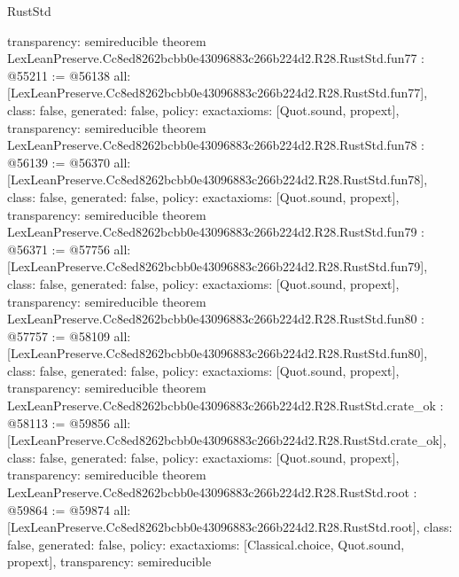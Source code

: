 \begin{lexlean}{RustStd}
\begin{coremodule}
{  transparency: semireducible
}
theorem LexLeanPreserve.Cc8ed8262bcbb0e43096883c266b224d2.R28.RustStd.fun77 : @55211 := @56138 {
  all: [LexLeanPreserve.Cc8ed8262bcbb0e43096883c266b224d2.R28.RustStd.fun77],
  class: false,
  generated: false,
  policy: exact{axioms: [Quot.sound, propext]},
  transparency: semireducible
}
theorem LexLeanPreserve.Cc8ed8262bcbb0e43096883c266b224d2.R28.RustStd.fun78 : @56139 := @56370 {
  all: [LexLeanPreserve.Cc8ed8262bcbb0e43096883c266b224d2.R28.RustStd.fun78],
  class: false,
  generated: false,
  policy: exact{axioms: [Quot.sound, propext]},
  transparency: semireducible
}
theorem LexLeanPreserve.Cc8ed8262bcbb0e43096883c266b224d2.R28.RustStd.fun79 : @56371 := @57756 {
  all: [LexLeanPreserve.Cc8ed8262bcbb0e43096883c266b224d2.R28.RustStd.fun79],
  class: false,
  generated: false,
  policy: exact{axioms: [Quot.sound, propext]},
  transparency: semireducible
}
theorem LexLeanPreserve.Cc8ed8262bcbb0e43096883c266b224d2.R28.RustStd.fun80 : @57757 := @58109 {
  all: [LexLeanPreserve.Cc8ed8262bcbb0e43096883c266b224d2.R28.RustStd.fun80],
  class: false,
  generated: false,
  policy: exact{axioms: [Quot.sound, propext]},
  transparency: semireducible
}
theorem LexLeanPreserve.Cc8ed8262bcbb0e43096883c266b224d2.R28.RustStd.crate_ok : @58113 := @59856 {
  all: [LexLeanPreserve.Cc8ed8262bcbb0e43096883c266b224d2.R28.RustStd.crate_ok],
  class: false,
  generated: false,
  policy: exact{axioms: [Quot.sound, propext]},
  transparency: semireducible
}
theorem LexLeanPreserve.Cc8ed8262bcbb0e43096883c266b224d2.R28.RustStd.root : @59864 := @59874 {
  all: [LexLeanPreserve.Cc8ed8262bcbb0e43096883c266b224d2.R28.RustStd.root],
  class: false,
  generated: false,
  policy: exact{axioms: [Classical.choice, Quot.sound, propext]},
  transparency: semireducible
}


\end{coremodule}
\end{lexlean}
